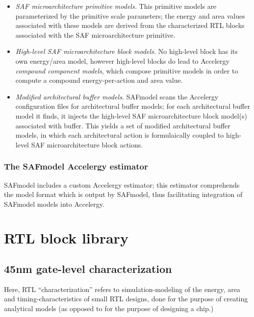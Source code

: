 \begin{itemize}
    \item \textit{SAF microarchitecture primitive models.} This primitive models are parameterized by the primitive scale parameters; the energy and area values associated with these models are derived from the characterized RTL blocks associated with the SAF microarchitecture primitive.
    \item \textit{High-level SAF microarchitecture block models.} No high-level block has its own energy/area model, however high-level blocks do lead to Accelergy \textit{compound component models}\cite{accelergy}, which compose primitive models in order to compute a compound energy-per-action and area value.
    \item \textit{Modified architectural buffer models.} SAFmodel scans the Accelergy configuration files for architectural buffer models; for each architectural buffer model it finds, it injects the high-level SAF microarchitecture block model(s) associated with buffer. This yields a set of modified architectural buffer models, in which each architectural action is formulaically coupled to high-level SAF microarchitecture block actions.
\end{itemize}

\subsubsection{The SAFmodel Accelergy estimator}

SAFmodel includes a custom Accelergy estimator\cite{accelergy}; this estimator comprehends the model format which is output by SAFmodel, thus facilitating integration of SAFmodel models into Accelergy.

\section{RTL block library}


\subsection{45nm gate-level characterization}

Here, RTL ``characterization'' refers to simulation-modeling of the energy, area and timing-characteristics of small RTL designs, done for the purpose of creating analytical models (as opposed to for the purpose of designing a chip.)

